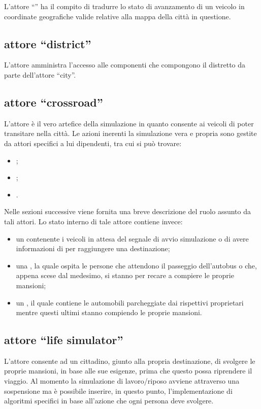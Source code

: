L'attore ``'' ha il compito di tradurre lo stato di avanzamento di un veicolo in coordinate geografiche valide relative alla mappa della città in questione.

\subsection*{attore ``district''}
\label{soluzione-proposta-architettura-district}
L'attore amministra l'accesso alle componenti che compongono il distretto da parte dell'attore ``city''.

\subsection*{attore ``crossroad''}
\label{soluzione-proposta-architettura-crossroad}
L'attore è il vero artefice della simulazione in quanto consente ai veicoli di poter transitare nella città. Le azioni inerenti la simulazione vera e propria sono gestite da attori specifici a lui dipendenti, tra cui si può trovare:

\begin{itemize}
\item{;}
\item{;}
\item{.}
\end{itemize}

Nelle sezioni successive viene fornita una breve descrizione del ruolo assunto da tali attori. Lo stato interno di tale attore contiene invece:

\begin{itemize}
\item{un  contenente i veicoli in attesa del segnale di avvio simulazione o di avere informazioni di  per raggiungere una destinazione;}
\item{una , la quale ospita le persone che attendono il passeggio dell'autobus o che, appena scese dal medesimo, si stanno per recare a compiere le proprie mansioni;}
\item{un , il quale contiene le automobili parcheggiate dai rispettivi proprietari mentre questi ultimi stanno compiendo le proprie mansioni.}
\end{itemize}

\subsection*{attore ``life simulator''}
\label{soluzione-proposta-architettura-life-simulator}
L'attore consente ad un cittadino, giunto alla propria destinazione, di svolgere le proprie mansioni, in base alle sue esigenze, prima che questo possa riprendere il viaggio. Al momento la simulazione di lavoro/riposo avviene attraverso una sospensione ma è possibile inserire, in questo punto, l'implementazione di algoritmi specifici in base all'azione che ogni persona deve svolgere.


